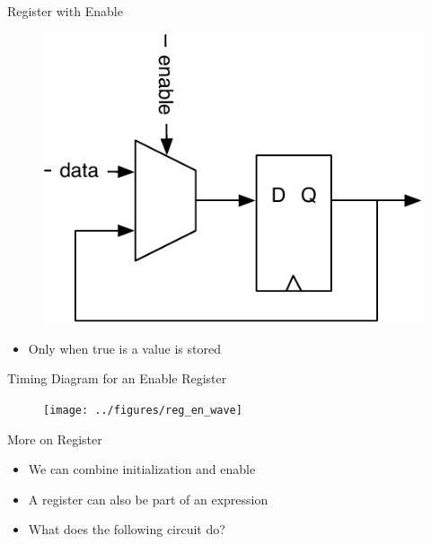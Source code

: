 \begin{frame}[fragile]{Register with Enable}
\begin{figure}
  \includegraphics[scale=\scale]{../figures/register-enable}
\end{figure}
\begin{itemize}
\item Only when  true is a value is stored
\end{itemize}

\end{frame}

\begin{frame}[fragile]{Timing Diagram for an Enable Register}
\begin{figure}
  \texttt{[image: ../figures/reg\_en\_wave]}
\end{figure}
\end{frame}

\begin{frame}[fragile]{More on Register}
\begin{itemize}
\item We can combine initialization and enable
\end{itemize}
\begin{itemize}
\item A register can also be part of an expression
\item What does the following circuit do?
\end{itemize}
\end{frame}


